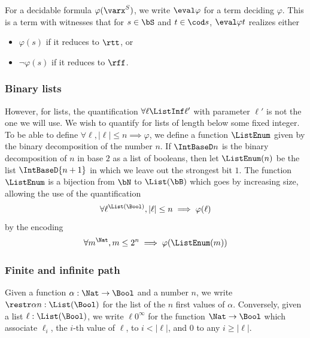 For a decidable formula $\varphi(\varx^S)$, we write $\eval\varphi$ for a term deciding $\varphi$. This is a term with witnesses that for $s \in \bS$ and $t \in \cod s$, $\eval\varphi t$ realizes either
\begin{itemize}
\item $\varphi(s)$ if it reduces to $\rtt$, or
\item $\lnot\varphi(s)$ if it reduces to $\rff$.
\end{itemize}

\subsubsection{Binary lists}

However, for lists, the quantification $\forall \ell \ListInf \ell'$ with parameter $\ell'$ is not the one we will use. We wish to quantify for lists of length below some fixed integer. To be able to define $\forall \ell, |\ell| \leq n \implies \varphi$, we define a function $\ListEnum$ given by the binary decomposition of the number $n$. If $\IntBaseD n$ is the binary decomposition of $n$ in base $2$ as a list of booleans, then let $\ListEnum(n)$ be the list $\IntBaseD{n+1}$ in which we leave out the strongest bit $1$. The function $\ListEnum$ is a bijection from $\bN$ to $\List(\bB)$ which goes by increasing size, allowing the use of the quantification
\[\forall \ell^{\List(\Bool)}, |\ell| \leq n \implies \varphi(\ell)\]
by the encoding
\[\forall m^{\Nat}, m \leq 2^n \implies \varphi(\ListEnum(m))\]

\subsubsection{Finite and infinite path}

Given a function $\alpha : \Nat \to \Bool$ and a number $n$, we write $\restr \alpha n : \List(\Bool)$ for the list of the $n$ first values of $\alpha$. Conversely, given a list $\ell : \List(\Bool)$, we write $\ell0^\infty$ for the function $\Nat \to \Bool$ which associate $\ell_i$, the $i$-th value of $\ell$, to $i < |\ell|$, and $0$ to any $i \geq |\ell|$.


